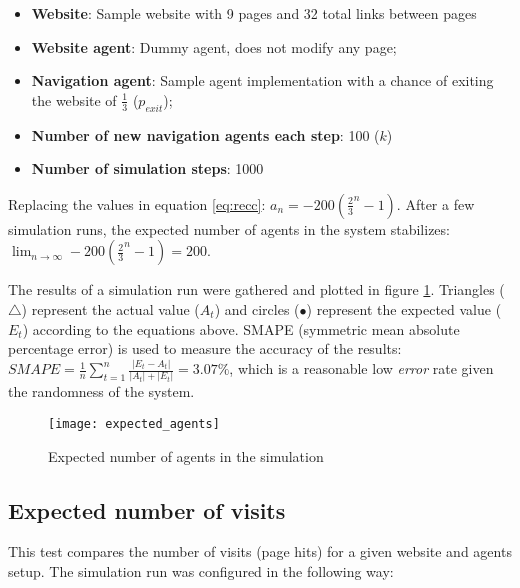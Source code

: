 \begin{itemize}
    \item \textbf{Website}: Sample website with 9 pages and 32 total links 
    between pages
    \item \textbf{Website agent}: Dummy agent, does not modify any page;
    \item \textbf{Navigation agent}: Sample agent implementation with a chance 
    of exiting the website of $\frac{1}{3}$ ($p_{exit}$);
    \item \textbf{Number of new navigation agents each step}: 100 ($k$)
    \item \textbf{Number of simulation steps}: 1000
\end{itemize}

Replacing the values in equation \ref{eq:recc}: $a_{n} = -200 \left ( 
\frac{2}{3}^{n} - 1 \right )$. After a few simulation runs, the expected number 
of agents in the system stabilizes: $\lim_{n\to \infty} -200 \left ( 
\frac{2}{3}^{n} - 1 \right ) = 200$.

The results of a simulation run were gathered and plotted in figure 
\ref{fig:expagents}. Triangles ($\triangle$) represent the actual value 
($A_{t}$) and circles ($\bullet$) represent the expected value ($E_{t}$) 
according to the equations above. SMAPE (symmetric mean absolute percentage 
error)\cite{makridakis1993accuracy} is used to measure the accuracy of the 
results: $ SMAPE = {\frac {1}{n}}\sum _{t=1}^{n}{\frac 
{\left|E_{t}-A_{t}\right|}{|A_{t}|+|E_{t}|}} = 3.07\% $, which is a reasonable 
low \textit{error} rate given the randomness of the system.

\begin{figure}[h]
    \begin{center}
        \leavevmode
        \texttt{[image: expected\_agents]}
        \caption{Expected number of agents in the simulation}
        \label{fig:expagents}
    \end{center}
\end{figure}

\subsection{Expected number of visits}

This test compares the number of visits (page hits) for a given website and 
agents setup. The simulation run was configured in the following way:


